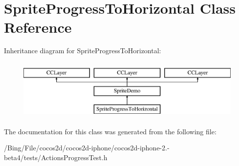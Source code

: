 \hypertarget{interface_sprite_progress_to_horizontal}{\section{Sprite\-Progress\-To\-Horizontal Class Reference}
\label{interface_sprite_progress_to_horizontal}
}
Inheritance diagram for Sprite\-Progress\-To\-Horizontal\-:\begin{figure}[H]
\begin{center}
\leavevmode
\includegraphics[height=3.000000cm]{interface_sprite_progress_to_horizontal}
\end{center}
\end{figure}


The documentation for this class was generated from the following file\-:\begin{DoxyCompactItemize}
\item 
/\-Bing/\-File/cocos2d/cocos2d-\/iphone/cocos2d-\/iphone-\/2.-\/beta4/tests/Actions\-Progress\-Test.\-h\end{DoxyCompactItemize}
